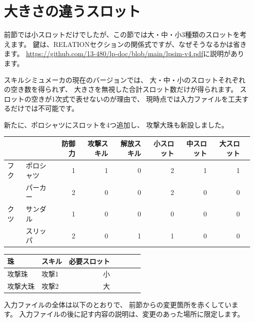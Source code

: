 \documentclass[dvipdfmx]{jsarticle}
\begin{document}
\begin{center}
\end{center}

\section{大きさの違うスロット} %
前節では小スロットだけでしたが、この節では大・中・小3種類のスロットを考えます。
鍵は、RELATIONセクションの関係式ですが、なぜそうなるかは省きます。
\url{https://github.com/13-480/lp-doc/blob/main/lpsim-v4.pdf}に説明があります。

スキルシミュメーカの現在のバージョンでは、
大・中・小のスロットそれぞれの空き数を得られず、
大きさを無視した合計スロット数だけが得られます。
スロットの空きが1次式で表せないのが理由で、
現時点では入力ファイルを工夫するだけでは不可能です。

新たに、ポロシャツにスロットを4つ追加し、
攻撃大珠も新設しました。
\medskip
%
\begin{center}
\begin{tabular}{llrrrrrrr}
\toprule
&& 防御力 & 攻撃スキル & 解放スキル & 小スロット& 中スロット& 大スロット\\
\midrule
フク
& ポロシャツ & 1 & 1 & 0 & 2 & 1 & 1\\
& パーカー   & 2 & 0 & 0 & 2 & 0 & 0\\
\midrule
クツ
& サンダル & 1 & 0 & 0 & 0 & 0 & 0\\
& スリッパ & 2 & 0 & 1 & 1 & 0 & 0\\
\bottomrule
\end{tabular}
\end{center}
%
\begin{center}
\begin{tabular}{llrrrrr}
\toprule
珠 & スキル & 必要スロット \\
\midrule
攻撃珠 & 攻撃1 & 小\\
攻撃大珠 & 攻撃2 & 大\\
\bottomrule
\end{tabular}
\end{center}
%
入力ファイルの全体は以下のとおりで、
前節からの変更箇所を赤くしています。
入力ファイルの後に記す内容の説明は、変更のあった場所に限定します。
\medskip
\end{document}
